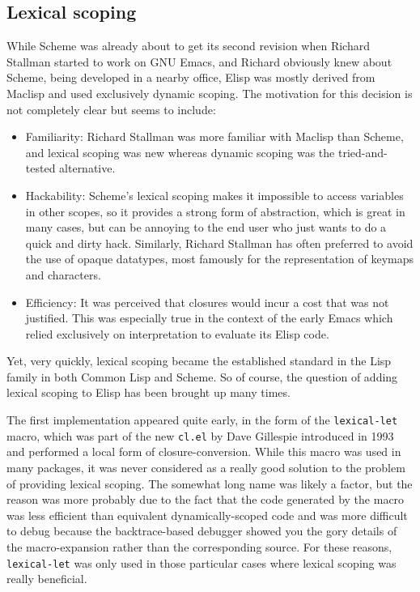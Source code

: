 \documentclass[format=acmsmall, review=false, screen=true]{acmart}
\newcommand \Elisp {Elisp}
\begin{document}
\subsection{Lexical scoping}

While Scheme was already about to get its second revision when Richard
Stallman started to work on GNU Emacs, and Richard obviously knew about
Scheme, being developed in a nearby office, \Elisp{} was mostly derived from
Maclisp and used exclusively dynamic scoping.  The motivation for this
decision is not completely clear but seems to include:
\begin{itemize}
\item Familiarity: Richard Stallman was more familiar with Maclisp than Scheme, and
  lexical scoping was new whereas dynamic scoping was the
  tried-and-tested alternative.
\item Hackability: Scheme's lexical scoping makes it impossible to access
  variables in other scopes, so it provides a strong form of abstraction,
  which is great in many cases, but can be annoying to the end user who just
  wants to do a quick and dirty hack.
  Similarly, Richard Stallman has often
  preferred to avoid the use of opaque datatypes, most famously for the
  representation of keymaps and characters.
\item Efficiency: It was perceived that closures would incur a cost that was
  not justified.  This was especially true in the context of the early Emacs
  which relied exclusively on interpretation to evaluate its \Elisp{} code.
\end{itemize}
Yet, very quickly, lexical scoping became the established standard in
the Lisp family in both Common Lisp and Scheme.
So of course, the question of adding lexical scoping to \Elisp{} has been
brought up many times.

The first implementation appeared quite early, in the form of the
\texttt{lexical-let} macro, which was part of the new \texttt{cl.el} by Dave
Gillespie  introduced in 1993 and performed
a local form of closure-conversion.
While this macro was used in many packages, it was never considered as
a really good solution to the problem of providing lexical scoping.
The somewhat long name was likely a factor, but the reason was more probably
due to the fact that the code generated by the macro was less efficient than
equivalent dynamically-scoped code and was more difficult to debug because
the backtrace-based debugger showed you the gory details of the
macro-expansion rather than the corresponding source.  For these reasons,
\texttt{lexical-let} was only used in those particular cases where lexical
scoping was really beneficial.
\end{document}
